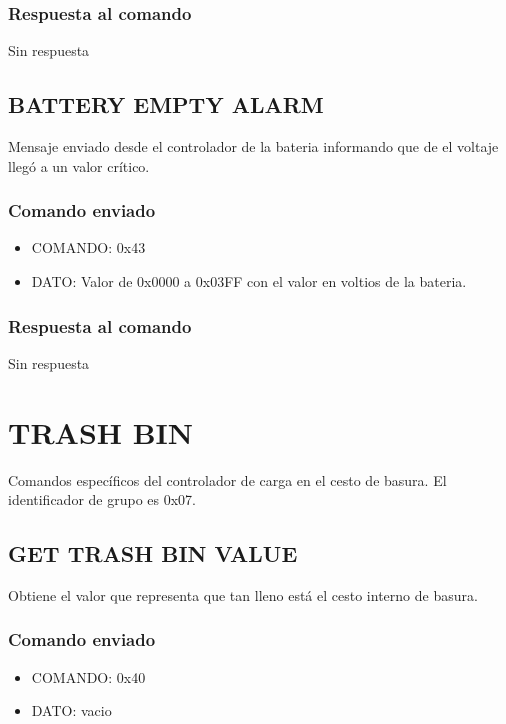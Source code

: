 \documentclass[a4paper,10pt]{article}
\begin{document}
\subsubsection*{Respuesta al comando}

Sin respuesta

\subsection{BATTERY EMPTY ALARM}
\label{battery_empty}

Mensaje enviado desde el controlador de la bateria informando que de el voltaje lleg\'o a un valor cr\'itico.

\subsubsection*{Comando enviado}

\begin{itemize}
	\item{COMANDO:} 0x43
	\item{DATO:} Valor de 0x0000 a 0x03FF con el valor en voltios de la bateria.
\end{itemize}

\subsubsection*{Respuesta al comando}

Sin respuesta

\section{TRASH BIN} 
\label{grupo_trash_bin}

Comandos espec\'ificos del controlador de carga en el cesto de basura.
El identificador de grupo es 0x07.

\subsection{GET TRASH BIN VALUE}
\label{get_trash_bin_value}

Obtiene el valor que representa que tan lleno est\'a el cesto interno de basura.

\subsubsection*{Comando enviado}

\begin{itemize}
	\item{COMANDO:} 0x40
	\item{DATO:} vacio
\end{itemize}
\end{document}
